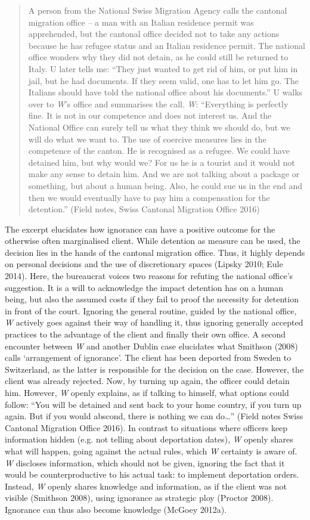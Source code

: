     \blockquote{A person from the National Swiss Migration Agency calls the cantonal migration office – a man with an Italian residence permit was apprehended, but the cantonal office decided not to take any actions because he has refugee status and an Italian residence permit. The national office wonders why they did not detain, as he could still be returned to Italy. U  later tells me: “They just wanted to get rid of him, or put him in jail, but he had documents. If they seem valid, one has to let him go. The Italians should have told the national office about his documents.” U walks over to \emph{W}’s office and summarises the call. \emph{W}: “Everything is perfectly fine. It is not in our competence and does not interest us. And the National Office can surely tell us what they think we should do, but we will do what we want to. The use of coercive measures lies in the competence of the canton. He is recognised as a refugee. We could have detained him, but why would we? For us he is a tourist and it would not make any sense to detain him. And we are not talking about a package or something, but about a human being. Also, he could sue us in the end and then we would eventually have to pay him a compensation for the detention.” (Field notes, Swiss Cantonal Migration Office 2016)}
\par
The excerpt elucidates how ignorance can have a positive outcome for the otherwise often marginalised client. While detention as measure can be used, the decision lies in the hands of the cantonal migration office. Thus, it highly depends on personal decisions and the use of discretionary spaces (Lipsky 2010; Eule 2014). Here, the bureaucrat voices two reasons for refuting the national office’s suggestion. It is a will to acknowledge the impact detention has on a human being, but also the assumed costs if they fail to proof the necessity for detention in front of the court. Ignoring the general routine, guided by the national office, \textit{W} actively goes against their way of handling it, thus ignoring generally accepted practices to the advantage of the client and finally their own office. A second encounter between \emph{W} and another Dublin case elucidates what Smithson (2008) calls ‘arrangement of ignorance’. The client has been deported from Sweden to Switzerland, as the latter is responsible for the decision on the case. However, the client was already rejected. Now, by turning up again, the officer could detain him. However, \textit{W} openly explains, as if talking to himself, what options could follow: \enquote{You will be detained and sent back to your home country, if you turn up again. But if you would abscond, there is nothing we can do…} (Field notes Swiss Cantonal Migration Office 2016). In contrast to situations where officers keep information hidden (e.g. not telling about deportation dates), \emph{W} openly shares what will happen, going against the actual rules, which \emph{W} certainty is aware of. \emph{W} discloses information, which should not be given, ignoring the fact that it would be counterproductive to his actual task: to implement deportation orders. Instead, \emph{W} openly shares knowledge and information, as if the client was not visible (Smithson 2008), using ignorance as strategic ploy (Proctor 2008). Ignorance can thus also become knowledge (McGoey 2012a).
